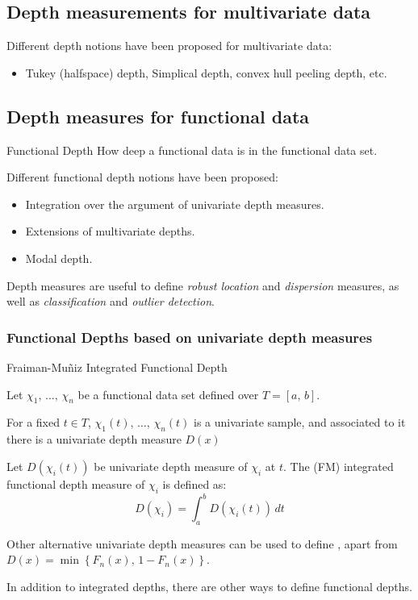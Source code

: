 \subsection{Depth measurements for multivariate data}

Different depth notions have been proposed for multivariate data:
\begin{itemize}
    \item Tukey (halfspace) depth, Simplical depth, convex hull peeling depth, etc.
\end{itemize}

\subsection{Depth measures for functional data}

\begin{definition}{Functional Depth}{}
    How deep a functional data is in the functional data set.

    Different functional depth notions have been proposed:
    \begin{itemize}
        \item Integration over the argument of univariate depth measures.
        \item Extensions of multivariate depths.
        \item Modal depth.
    \end{itemize}
    \tcblower
    Depth measures are useful to define \emph{robust location} and \emph{dispersion} measures,
    as well as \emph{classification} and \emph{outlier detection}.
\end{definition}

\subsubsection{Functional Depths based on univariate depth measures}

\begin{definition}{Fraiman-Muñiz Integrated Functional Depth}{}

Let $\chi_1,\, \dots,\, \chi_n$ be a functional data set defined over
$T = [a,\,b]$.

For a fixed $t \in T$, $\chi_1(t),\, \dots,\, \chi_n(t)$ is a univariate sample,
and associated to it there is a univariate depth measure $D(x)$

Let $D(\chi_i(t))$ be univariate depth measure of $\chi_i$ at $t$.
The  (FM) integrated functional depth measure of
$\chi_i$ is defined as:
\begin{equation*}
    D(\chi_i) = \int_a^b D(\chi_i(t)) \, dt \tag{FM depth}
\end{equation*}
\tcblower
\begin{note}
    Other alternative univariate depth measures can be used to define ,
    apart from $D(x) = \min\left\{ F_n(x),\, 1 - F_n(x) \right\}$.
\end{note}
\begin{note}
    In addition to integrated depths, there are other ways to define functional depths.
\end{note}
\end{definition}


